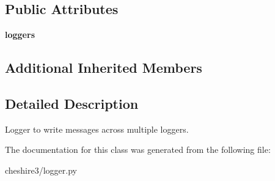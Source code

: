 \subsection*{Public Attributes}
\begin{DoxyCompactItemize}
\item 
\hypertarget{classcheshire3_1_1logger_1_1_multiple_logger_aac156d13a9c8a160414447ba26756052}{{\bfseries loggers}}\label{classcheshire3_1_1logger_1_1_multiple_logger_aac156d13a9c8a160414447ba26756052}

\end{DoxyCompactItemize}
\subsection*{Additional Inherited Members}


\subsection{Detailed Description}
\begin{DoxyVerb}Logger to write messages across multiple loggers.\end{DoxyVerb}
 

The documentation for this class was generated from the following file\-:\begin{DoxyCompactItemize}
\item 
cheshire3/logger.\-py\end{DoxyCompactItemize}
